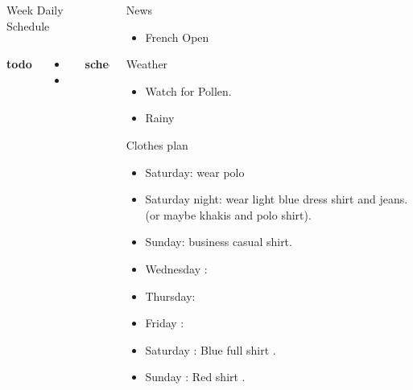 \documentclass[serif, mathserif, final]{beamer}
\begin{document}
\begin{frame}{}
\begin{columns}
\begin{column}{0.50\linewidth}
\begin{block}{Week Daily Schedule}
\begin{columns}
  \textbf{\small todo}\\
  \begin{itemize}
  \item \tiny 
  \item \tiny 
    
  \end{itemize}
  \textbf{\small schedule}\\
  \begin{enumerate} 
    \tiny \item \tiny 
  \end{enumerate} 
    \end{columns}
  \end{block}
\end{column}%

\begin{column}{0.20\linewidth}
  \begin{block}{News}
    \begin{itemize} 
      \tiny \item \tiny French Open
    \end{itemize}
  \end{block}
  \begin{block}{Weather} 
    \begin{itemize}
      \tiny \item \tiny Watch for Pollen.
    \item \tiny Rainy 
    \end{itemize}
  \end{block} 
  \begin{block}{Clothes plan} 
    \begin{itemize} 
      \tiny \item \tiny Saturday: wear polo 
    \item \tiny Saturday night: wear light blue dress shirt and jeans. (or maybe khakis and polo shirt). 
    \item \tiny Sunday: business casual shirt. 
    \item \tiny Wednesday : 
    \item \tiny Thursday: 
    \item \tiny Friday : 
    \item \tiny Saturday : Blue full shirt . 
    \item \tiny Sunday : Red shirt .
    \end{itemize} 
  \end{block}


\end{column}
\end{columns}
\end{frame}
\end{document}

